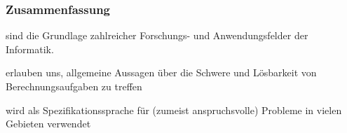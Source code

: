 \documentclass[onlymath]{beamer}
\begin{document}
\begin{frame}\frametitle{Zusammenfassung}

 sind die Grundlage zahlreicher Forschungs- und Anwendungsfelder der Informatik.
\bigskip

 erlauben uns, allgemeine Aussagen über die Schwere und Lösbarkeit
von Berechnungsaufgaben zu treffen
\bigskip

 wird als Spezifikationssprache für (zumeist anspruchsvolle) Probleme in vielen Gebieten verwendet
\bigskip



\end{frame}
\end{document}
